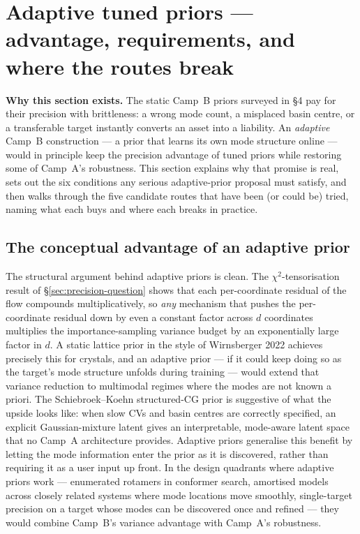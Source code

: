 \documentclass[11pt,letterpaper]{article}
\theoremstyle{plain}
\begin{document}
\section{Adaptive tuned priors --- advantage, requirements, and where the routes break}

\begin{callout}
\textbf{Why this section exists.} The static Camp~B priors surveyed in \S4
pay for their precision with brittleness: a wrong mode count, a misplaced
basin centre, or a transferable target instantly converts an asset into a
liability. An \emph{adaptive} Camp~B construction --- a prior that learns
its own mode structure online --- would in principle keep the precision
advantage of tuned priors while restoring some of Camp~A's robustness. This
section explains why that promise is real, sets out the six conditions any
serious adaptive-prior proposal must satisfy, and then walks through the
five candidate routes that have been (or could be) tried, naming what each
buys and where each breaks in practice.
\end{callout}

\subsection{The conceptual advantage of an adaptive prior}

The structural argument behind adaptive priors is clean. The
$\chi^2$-tensorisation result of \S\ref{sec:precision-question} shows that
each per-coordinate residual of the flow compounds multiplicatively, so
\emph{any} mechanism that pushes the per-coordinate residual down by even a
constant factor across $d$ coordinates multiplies the importance-sampling
variance budget by an exponentially large factor in $d$. A static lattice
prior in the style of Wirnsberger 2022 achieves precisely this for crystals,
and an adaptive prior --- if it could keep doing so as the target's mode
structure unfolds during training --- would extend that variance reduction
to multimodal regimes where the modes are not known a priori. The
Schiebroek--Koehn structured-CG prior is suggestive of what the upside
looks like: when slow CVs and basin centres are correctly specified, an
explicit Gaussian-mixture latent gives an interpretable, mode-aware latent
space that no Camp~A architecture provides. Adaptive priors generalise this
benefit by letting the mode information enter the prior as it is discovered,
rather than requiring it as a user input up front. In the design quadrants
where adaptive priors work --- enumerated rotamers in conformer search,
amortised models across closely related systems where mode locations move
smoothly, single-target precision on a target whose modes can be discovered
once and refined --- they would combine Camp~B's variance advantage with
Camp~A's robustness.
\end{document}
